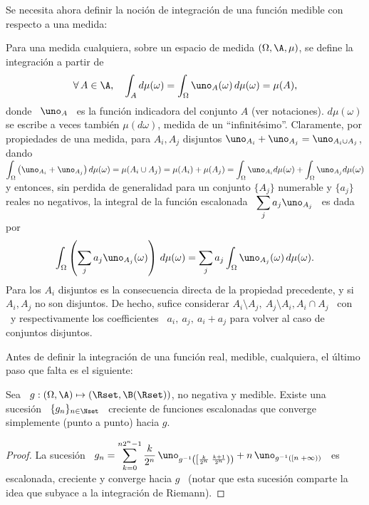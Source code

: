 Se necesita ahora definir la  noci\'on de integraci\'on de una funci\'on medible
con respecto a una medida:
%
\begin{definicion}
\label{Def:MP:MedidaIntegracion}
%
  Para una medida  cualquiera, sobre un espacio de  medida $(\Omega,\A,\mu)$, se
  define la integraci\'on a partir de
  \[
  \forall \, A \in \A,  \quad \int_A d\mu(\omega) = \int_\Omega \uno_A(\omega) \,
  d\mu(\omega) = \mu(A),
  \]
  donde  \  $\uno_A$  \  es   la  funci\'on  indicadora  del  conjunto  $A$  (ver
  notaciones).   $d\mu(\omega)$  se escribe  a  veces tambi\'en  $\mu(d\omega)$,
  medida de  un ``infinit\'esimo''.  Claramente, por propiedades  de una medida,
  para $ A_i, A_j$ disjuntos $\uno_{A_i} + \uno_{A_j} = \uno_{A_i \cup A_j}$, dando
  $\displaystyle \int_\Omega \left( \uno_{A_i} + \uno_{A_j} \right) d\mu(\omega) =
  \mu(A_i \cup A_j) = \mu(A_i) + \mu(A_j) = \int_\Omega \uno_{A_i} d\mu(\omega) +
  \int_\Omega  \uno_{A_j} d\mu(\omega)$  y entonces,  sin perdida  de generalidad
  para un conjunto $\{ A_j \}$ numerable
  y $\{  a_j \}$ reales no negativos,  la integral de la  funci\'on escalonada \
  $\displaystyle \sum_j a_j \uno_{A_j}$ \ es dada por
  \[
  \int_\Omega \left( \sum_j a_j \uno_{A_j}(\omega) \right) \, d\mu(\omega) =
  \sum_j a_j \int_\Omega \uno_{A_j}(\omega) \, d\mu(\omega).
  \]
  Para  los  $A_i$  disjuntos  es   la  consecuencia  directa  de  la  propiedad
  precedente, y  si $A_i,  A_j$ no son  disjuntos.  De hecho,  sufice considerar
  $A_i\setminus  A_j,  \:  A_j\setminus  A_i,  A_i \cap  A_j$  \  con  \modif{$A
    \setminus B = \{ \omega \tq \omega \in  A \: \et \: \omega \notin B \}$} \
  y respectivamente los coefficientes \ $a_i,  \: a_j, \: a_i + a_j$ para volver
  al caso de conjuntos disjuntos.
\end{definicion}


Antes de definir la integraci\'on de una funci\'on real, medible, cualquiera, el
\'ultimo paso que falta es el siguiente:
%
\begin{teorema}
\label{Teo:MP:MedibleLimite}
%
  Sea   \   $g:   (\Omega,\A)   \mapsto  (\Rset,\B(\Rset))$,   no   negativa   y
  medible. Existe  una sucesi\'on  \ $\{  g_n \}_{n \in  \Nset}$ \  creciente de
  funciones escalonadas que converge simplemente (punto a punto) hacia $g$.
\end{teorema}
%
\begin{proof}
  La  sucesi\'on \ $\displaystyle  g_n =  \sum_{k=0}^{n 2^n-1}  \frac{k}{2^n} \,
  \uno_{g^{-1}\left( \left[ \frac{k}{2^n} \; \frac{k+1}{2^n} \right) \right)} + n
  \, \uno_{g^{-1}\left(  \left[ n \;  +\infty \right) \right)}$ \  es escalonada,
  creciente y converge  hacia $g$ \ (notar que esta  sucesi\'on comparte la idea
  que subyace a la integraci\'on de Riemann).
\end{proof}

